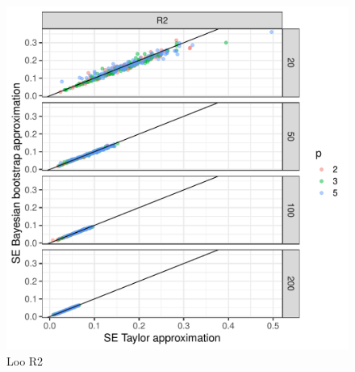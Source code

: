 \documentclass{article}
\begin{document}
\begin{figure}[!htb]
    \centering
    \includegraphics[width=\textwidth]{figures/loo_r2.pdf}
    \caption{Loo R2}
    \label{fig:loo-r2-plot}
\end{figure}

\newpage


\end{document}
